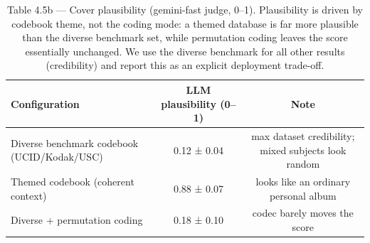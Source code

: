 \begin{table}[htbp]
\centering
\caption{Table 4.5b — Cover plausibility (gemini-fast judge, 0–1). Plausibility is driven by codebook theme, not the coding mode: a themed database is far more plausible than the diverse benchmark set, while permutation coding leaves the score essentially unchanged. We use the diverse benchmark for all other results (credibility) and report this as an explicit deployment trade-off.}
\label{tab:table_4_5_plausibility}
\begin{tabular}{lcc}
\hline
Configuration & LLM plausibility (0–1) & Note \\
\hline
Diverse benchmark codebook (UCID/Kodak/USC) & 0.12 ± 0.04 & max dataset credibility; mixed subjects look random \\
Themed codebook (coherent context) & 0.88 ± 0.07 & looks like an ordinary personal album \\
Diverse + permutation coding & 0.18 ± 0.10 & codec barely moves the score \\
\hline
\end{tabular}
\end{table}
